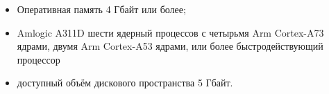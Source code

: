 \begin{itemize}
	\item Оперативная память 4 Гбайт или более;
	\item Amlogic A311D шести ядерный процессов с четырьмя Arm Cortex-A73
		ядрами, двумя Arm Cortex-A53 ядрами, или более быстродействующий
		процессор
	\item доступный объём дискового пространства 5 Гбайт. %
\end{itemize}

